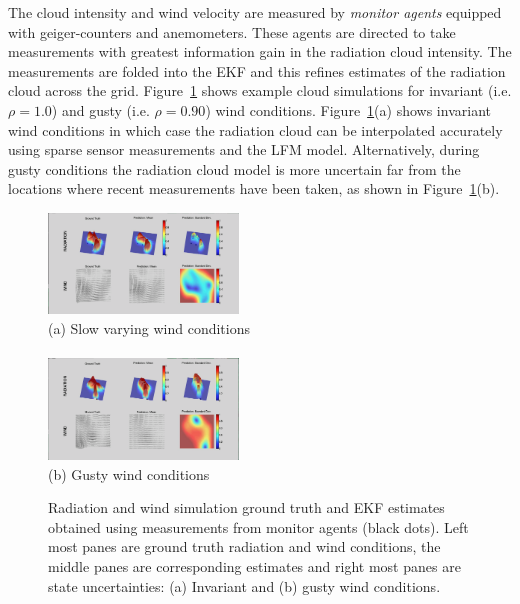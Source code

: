 The cloud intensity and wind velocity are measured by {\it monitor agents} equipped with geiger-counters and anemometers.  These agents are directed to take measurements with greatest information gain in the radiation cloud intensity.  The measurements are folded into the EKF and this refines estimates of the radiation cloud across the grid.  Figure~\ref{radiation_screen_shots} shows example cloud simulations for invariant (i.e. $\rho=1.0$) and gusty (i.e. $\rho=0.90$) wind conditions.  Figure~\ref{radiation_screen_shots}(a) shows invariant wind conditions in which case the radiation cloud can be interpolated accurately using sparse sensor measurements and the LFM model.  Alternatively, during gusty conditions the radiation cloud model is more uncertain far from the locations where recent measurements have been taken, as shown in Figure~\ref{radiation_screen_shots}(b).

\begin{figure}[ht] \begin{center}
    \includegraphics[width=0.45\textwidth]{figures/radiation_ss_calm.png}\\
    (a) Slow varying wind conditions\\ \ \\
    \includegraphics[width=0.45\textwidth]{figures/radiation_ss_gust.png}\\
    (b) Gusty wind conditions 
\caption{\label{radiation_screen_shots} Radiation and wind simulation ground truth and EKF estimates obtained using measurements from monitor agents (black dots).  Left most panes are ground truth radiation and wind conditions, the middle panes are corresponding estimates and right most panes are state uncertainties:  (a) Invariant and (b) gusty wind conditions.}
\end{center}
\end{figure}
